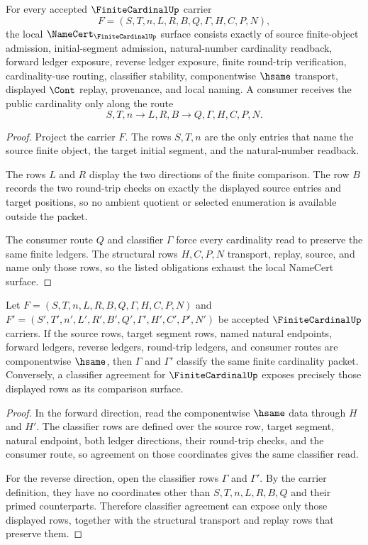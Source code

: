 \begin{theorem}
\label{thm:finite-cardinal-namecert-obligations}
For every accepted $\FiniteCardinalUp$ carrier
$$
F=(S,T,n,L,R,B,Q,\Gamma,H,C,P,N),
$$
the local $\NameCert_{\FiniteCardinalUp}$ surface consists exactly of source finite-object admission, initial-segment admission, natural-number cardinality readback, forward ledger exposure, reverse ledger exposure, finite round-trip verification, cardinality-use routing, classifier stability, componentwise $\hsame$ transport, displayed $\Cont$ replay, provenance, and local naming. A consumer receives the public cardinality only along the route
$$
S,T,n \longrightarrow L,R,B \longrightarrow Q,\Gamma,H,C,P,N .
$$
\end{theorem}
\begin{proof}
Project the carrier $F$. The rows $S,T,n$ are the only entries that name the source finite object, the target initial segment, and the natural-number readback.

The rows $L$ and $R$ display the two directions of the finite comparison. The row $B$ records the two round-trip checks on exactly the displayed source entries and target positions, so no ambient quotient or selected enumeration is available outside the packet.

The consumer route $Q$ and classifier $\Gamma$ force every cardinality read to preserve the same finite ledgers. The structural rows $H,C,P,N$ transport, replay, source, and name only those rows, so the listed obligations exhaust the local NameCert surface.
\end{proof}

\begin{theorem}
\label{thm:finite-cardinal-classifier-stability}
Let $F=(S,T,n,L,R,B,Q,\Gamma,H,C,P,N)$ and $F'=(S',T',n',L',R',B',Q',\Gamma',H',C',P',N')$ be accepted $\FiniteCardinalUp$ carriers. If the source rows, target segment rows, named natural endpoints, forward ledgers, reverse ledgers, round-trip ledgers, and consumer routes are componentwise $\hsame$, then $\Gamma$ and $\Gamma'$ classify the same finite cardinality packet. Conversely, a classifier agreement for $\FiniteCardinalUp$ exposes precisely those displayed rows as its comparison surface.
\end{theorem}
\begin{proof}
In the forward direction, read the componentwise $\hsame$ data through $H$ and $H'$. The classifier rows are defined over the source row, target segment, natural endpoint, both ledger directions, their round-trip checks, and the consumer route, so agreement on those coordinates gives the same classifier read.

For the reverse direction, open the classifier rows $\Gamma$ and $\Gamma'$. By the carrier definition, they have no coordinates other than $S,T,n,L,R,B,Q$ and their primed counterparts. Therefore classifier agreement can expose only those displayed rows, together with the structural transport and replay rows that preserve them.
\end{proof}

